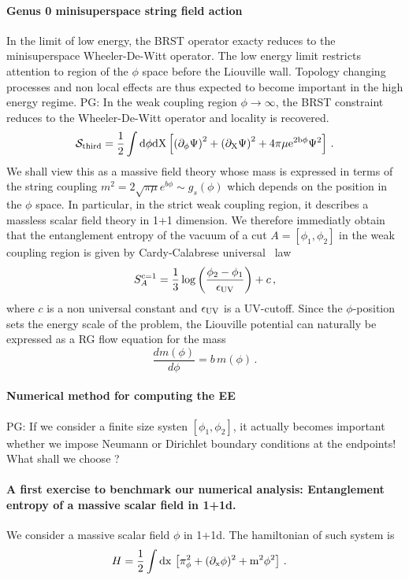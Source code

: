 \documentclass[a4paper]{article}
\newcommand{\purple}[1]{{\color{purple} #1 \color{black}}}
\newcommand{\PG}[1]{{\purple{PG: #1}}} %
\begin{document}
\paragraph{Genus 0 minisuperspace string field action}
In the limit of low energy, the BRST operator exacty reduces to the minisuperspace Wheeler-De-Witt operator. The low energy limit restricts attention to region of the $\phi$ space before the Liouville wall. Topology changing processes and non local effects are thus expected to become important in the high energy regime. \PG{In the weak coupling region $\phi\to\infty$, the BRST constraint reduces to the Wheeler-De-Witt operator and locality is recovered.}
\begin{equation}\label{eq:simpleentanglemententropy}
  \mathcal{S}_{\rm third} =  \frac{1}{2} \int \rm{d}\phi \rm{d}X \left[\left(\partial_\phi \Psi\right)^2+ \left(\partial_X \Psi\right)^2+4\pi \mu e^{2b\phi}\Psi^2\right]\,.
\end{equation}
We shall view this as a massive field theory whose mass is expressed in terms of the string coupling $m^2 = 2\sqrt{\pi \mu}e^{b\phi} \sim g_s(\phi)$ which depends on the position in the $\phi$ space. In particular, in the strict weak coupling region, it describes a massless scalar field theory in 1+1 dimension. We therefore immediatly obtain that the entanglement entropy of the vacuum of a cut $A=[\phi_1,\phi_2]$ in the weak coupling region is given by Cardy-Calabrese universal~\cite{Pasquale_Calabrese_2004} law
\begin{equation}
  S^{\rm c=1}_A = \frac{1}{3}\log\left(\frac{\phi_2-\phi_1}{\epsilon_{\rm UV}}\right)+c\,,
\end{equation}
where $c$ is a non universal constant and $\epsilon_{\rm UV}$ is a UV-cutoff. Since the $\phi$-position sets the energy scale of the problem, the Liouville potential can naturally be expressed as a RG flow equation for the mass
\begin{equation}
  \frac{d m(\phi)}{d\phi} = b\, m(\phi)\,.
\end{equation}
\paragraph{Numerical method for computing the EE}
\PG{If we consider a finite size systen $[\phi_1,\phi_2]$, it actually becomes important whether we impose Neumann or Dirichlet boundary conditions at the endpoints! What shall we choose ?}
\paragraph{A first exercise to benchmark our numerical analysis: Entanglement entropy of a massive scalar field in 1+1d.}
We consider a massive scalar field $\phi$ in 1+1d. The hamiltonian of such system is
\begin{equation}
\begin{aligned}
     H &= \frac{1}{2}\int \rm{d}x \,\left[\pi_\phi^2 + (\partial_x \phi)^2 + m^2 \phi^2\right]\,.
\end{aligned}
\end{equation}
\end{document}
